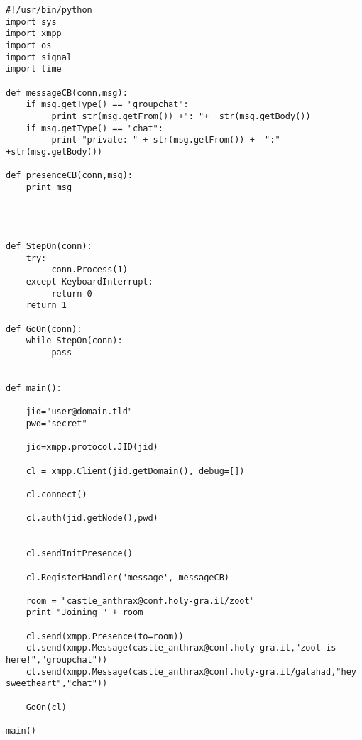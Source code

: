 \begin{verbatim}
#!/usr/bin/python
import sys
import xmpp
import os
import signal
import time

def messageCB(conn,msg):
    if msg.getType() == "groupchat":
         print str(msg.getFrom()) +": "+  str(msg.getBody())
    if msg.getType() == "chat":
         print "private: " + str(msg.getFrom()) +  ":" +str(msg.getBody())

def presenceCB(conn,msg):
    print msg




def StepOn(conn):
    try:
         conn.Process(1)
    except KeyboardInterrupt:
         return 0
    return 1

def GoOn(conn):
    while StepOn(conn):
         pass


def main():

    jid="user@domain.tld"
    pwd="secret"

    jid=xmpp.protocol.JID(jid)

    cl = xmpp.Client(jid.getDomain(), debug=[])

    cl.connect()

    cl.auth(jid.getNode(),pwd)


    cl.sendInitPresence()

    cl.RegisterHandler('message', messageCB)

    room = "castle_anthrax@conf.holy-gra.il/zoot"
    print "Joining " + room

    cl.send(xmpp.Presence(to=room))
    cl.send(xmpp.Message(castle_anthrax@conf.holy-gra.il,"zoot is here!","groupchat"))
    cl.send(xmpp.Message(castle_anthrax@conf.holy-gra.il/galahad,"hey sweetheart","chat"))

    GoOn(cl)

main()
\end{verbatim}